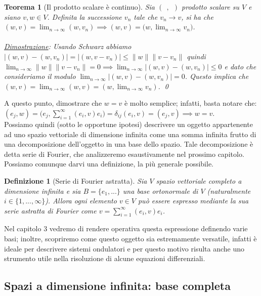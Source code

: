 \documentclass[a4paper,12pt]{report}
\newtheorem{teorema}{Teorema}[chapter]
\newtheorem{definizione}{Definizione}[chapter]
\begin{document}
\begin{teorema}[Il prodotto scalare è continuo]\label{thm: 2.6}
    Sia $( \ \ , \ \ )$ prodotto scalare su $V$ e siano $v,w \in V$. Definita la successione $v_n$ tale che $v_n \to v$, si ha che $(w,v)=\displaystyle \lim_{n\to \infty}(w,v_n)\implies(w,v)=\big(w, \lim_{n\to\infty}v_n \big)$.
    \\
    \\ \underline{Dimostrazione}: Usando Schwarz abbiamo $|(w,v)-(w,v_n)|=|(w,v-v_n)| \leq \|w\| \|v-v_n\|$ quindi $\displaystyle\lim_{n \to \infty}\|w\|\|v-v_n\|=0 \implies \lim_{n \to \infty}|(w,v)-(w,v_n)|\leq0$ e dato che consideriamo il modulo $\displaystyle\lim_{n \to \infty}|(w,v)-(w,v_n)|=0$. Questo implica che $(w,v)=\displaystyle\lim_{n\to\infty}(w,v)=(w,\lim_{n\to \infty}v_n)$. \qed
\end{teorema}

A questo punto, dimostrare che $w=v$ è molto semplice; infatti, basta notare che: 
\\ $(e_j,w)=\bigg(e_j, \displaystyle\sum_{i=1}^{\infty}(e_i,v)e_i\bigg)=\delta_{ij}(e_i,v)=(e_j,v)\implies w=v$. 
\\Possiamo quindi (sotto le opportune ipotesi) descrivere un oggetto appartenente ad uno spazio vettoriale di dimensione infinita come una somma infinita frutto di una decomposizione dell'oggetto in una base dello spazio. Tale decomposizione è detta serie di Fourier, che analizzeremo esaustivamente nel prossimo capitolo. Possiamo comunque darvi una definizione, la più generale possibile.

\begin{definizione}[Serie di Fourier astratta]\label{def: 2.11}
    Sia $V$ spazio vettoriale completo a dimensione infinita e sia $B=\{e_1,...\}$ una base ortonormale di $V$ (naturalmente $i\in \{1,..., \infty\}$). Allora ogni elemento $v \in V$ può essere espresso mediante la sua serie astratta di Fourier come $v=\displaystyle\sum_{i=1}^{\infty}(e_i, v)e_i$.
\end{definizione}

Nel capitolo 3 vedremo di rendere operativa questa espressione definendo varie basi; inoltre, scopriremo come questo oggetto sia estremamente versatile, infatti è ideale per descrivere sistemi ondulatori e per questo motivo risulta anche uno strumento utile nella risoluzione di alcune equazioni differenziali.

\subsection{Spazi a dimensione infinita: base completa}
\end{document}
